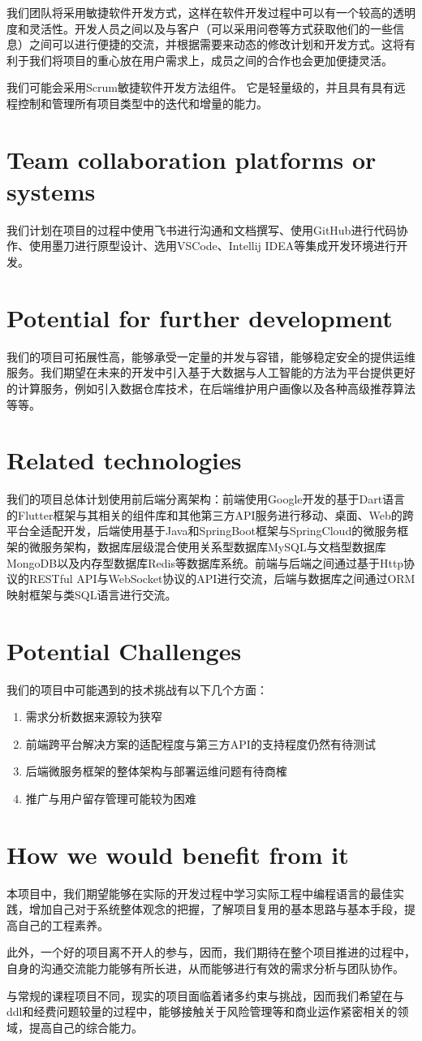 \documentclass[cn,black,10pt,normal]{elegantnote}
\begin{document}
我们团队将采用敏捷软件开发方式，这样在软件开发过程中可以有一个较高的透明度和灵活性。开发人员之间以及与客户（可以采用问卷等方式获取他们的一些信息）之间可以进行便捷的交流，并根据需要来动态的修改计划和开发方式。这将有利于我们将项目的重心放在用户需求上，成员之间的合作也会更加便捷灵活。

我们可能会采用Scrum敏捷软件开发方法组件。 它是轻量级的，并且具有具有远程控制和管理所有项目类型中的迭代和增量的能力。

\section{Team collaboration platforms or systems}

我们计划在项目的过程中使用飞书进行沟通和文档撰写、使用GitHub进行代码协作、使用墨刀进行原型设计、选用VSCode、Intellij IDEA等集成开发环境进行开发。

\section{Potential for further development}

我们的项目可拓展性高，能够承受一定量的并发与容错，能够稳定安全的提供运维服务。我们期望在未来的开发中引入基于大数据与人工智能的方法为平台提供更好的计算服务，例如引入数据仓库技术，在后端维护用户画像以及各种高级推荐算法等等。

\section{Related technologies}

我们的项目总体计划使用前后端分离架构：前端使用Google开发的基于Dart语言的Flutter框架与其相关的组件库和其他第三方API服务进行移动、桌面、Web的跨平台全适配开发，后端使用基于Java和SpringBoot框架与SpringCloud的微服务框架的微服务架构，数据库层级混合使用关系型数据库MySQL与文档型数据库MongoDB以及内存型数据库Redis等数据库系统。前端与后端之间通过基于Http协议的RESTful API与WebSocket协议的API进行交流，后端与数据库之间通过ORM映射框架与类SQL语言进行交流。

\section{Potential Challenges}
我们的项目中可能遇到的技术挑战有以下几个方面：
\begin{enumerate}
    \item 需求分析数据来源较为狭窄
    \item 前端跨平台解决方案的适配程度与第三方API的支持程度仍然有待测试
    \item 后端微服务框架的整体架构与部署运维问题有待商榷
    \item 推广与用户留存管理可能较为困难
\end{enumerate}

\section{How we would benefit from it}
本项目中，我们期望能够在实际的开发过程中学习实际工程中编程语言的最佳实践，增加自己对于系统整体观念的把握，了解项目复用的基本思路与基本手段，提高自己的工程素养。

此外，一个好的项目离不开人的参与，因而，我们期待在整个项目推进的过程中，自身的沟通交流能力能够有所长进，从而能够进行有效的需求分析与团队协作。

与常规的课程项目不同，现实的项目面临着诸多约束与挑战，因而我们希望在与ddl和经费问题较量的过程中，能够接触关于风险管理等和商业运作紧密相关的领域，提高自己的综合能力。
\end{document}
